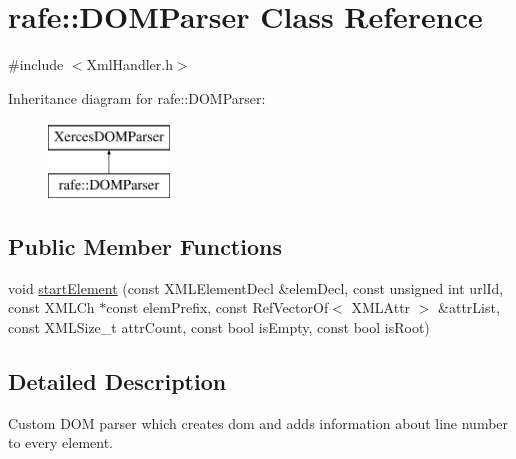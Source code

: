 \hypertarget{classrafe_1_1_d_o_m_parser}{\section{rafe\+:\+:D\+O\+M\+Parser Class Reference}
\label{classrafe_1_1_d_o_m_parser}
}


{\ttfamily \#include $<$Xml\+Handler.\+h$>$}

Inheritance diagram for rafe\+:\+:D\+O\+M\+Parser\+:\begin{figure}[H]
\begin{center}
\leavevmode
\includegraphics[height=2.000000cm]{classrafe_1_1_d_o_m_parser}
\end{center}
\end{figure}
\subsection*{Public Member Functions}
\begin{DoxyCompactItemize}
\item 
void \hyperlink{classrafe_1_1_d_o_m_parser_ac9621821b9b1030a1caee5a27454855c}{start\+Element} (const X\+M\+L\+Element\+Decl \&elem\+Decl, const unsigned int url\+Id, const X\+M\+L\+Ch $\ast$const elem\+Prefix, const Ref\+Vector\+Of$<$ X\+M\+L\+Attr $>$ \&attr\+List, const X\+M\+L\+Size\+\_\+t attr\+Count, const bool is\+Empty, const bool is\+Root)
\end{DoxyCompactItemize}


\subsection{Detailed Description}
Custom D\+O\+M parser which creates dom and adds information about line number to every element. 

